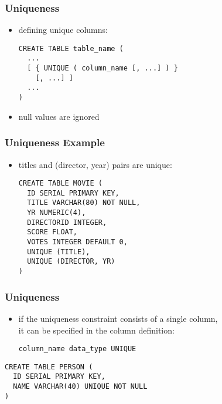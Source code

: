 \documentclass[dvipsnames]{beamer}
\theoremstyle{plain}
\begin{document}
\begin{frame}[fragile]
  \frametitle{Uniqueness}

  \begin{itemize}
    \item defining unique columns:
    \begin{lstlisting}
CREATE TABLE table_name (
  ...
  [ { UNIQUE ( column_name [, ...] ) }
    [, ...] ]
  ...
)
    \end{lstlisting}

    \item null values are ignored
  \end{itemize}
\end{frame}

\begin{frame}[fragile]
  \frametitle{Uniqueness Example}

  \begin{itemize}
    \item titles and (director, year) pairs are unique:
    \begin{lstlisting}
CREATE TABLE MOVIE (
  ID SERIAL PRIMARY KEY,
  TITLE VARCHAR(80) NOT NULL,
  YR NUMERIC(4),
  DIRECTORID INTEGER,
  SCORE FLOAT,
  VOTES INTEGER DEFAULT 0,
  UNIQUE (TITLE),
  UNIQUE (DIRECTOR, YR)
)
    \end{lstlisting}
  \end{itemize}
\end{frame}

\begin{frame}[fragile]
  \frametitle{Uniqueness}

  \begin{itemize}
    \item if the uniqueness constraint consists of a single column,\\
      it can be specified in the column definition:
    \begin{lstlisting}
column_name data_type UNIQUE
    \end{lstlisting}
  \end{itemize}

  \begin{example}
    \begin{lstlisting}
CREATE TABLE PERSON (
  ID SERIAL PRIMARY KEY,
  NAME VARCHAR(40) UNIQUE NOT NULL
)
    \end{lstlisting}
  \end{example}
\end{frame}
\end{document}
